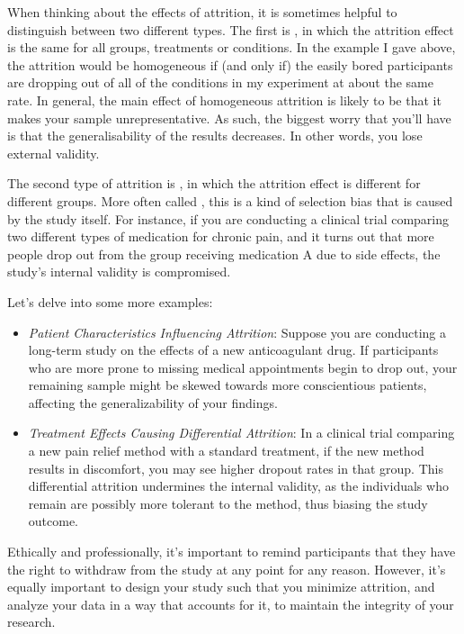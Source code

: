 
When thinking about the effects of attrition, it is sometimes helpful to distinguish between two different types. The first is , in which the attrition effect is the same for all groups, treatments or conditions. In the example I gave above, the attrition would be homogeneous if (and only if) the easily bored participants are dropping out of all of the conditions in my experiment at about the same rate. In general, the main effect of homogeneous attrition is likely to be that it makes your sample unrepresentative. As such, the biggest worry that you'll have is that the generalisability of the results decreases. In other words, you lose external validity.

The second type of attrition is , in which the attrition effect is different for different groups. More often called , this is a kind of selection bias that is caused by the study itself. For instance, if you are conducting a clinical trial comparing two different types of medication for chronic pain, and it turns out that more people drop out from the group receiving medication A due to side effects, the study's internal validity is compromised.

Let's delve into some more examples:

\begin{itemize}
\item \textit{Patient Characteristics Influencing Attrition}: Suppose you are conducting a long-term study on the effects of a new anticoagulant drug. If participants who are more prone to missing medical appointments begin to drop out, your remaining sample might be skewed towards more conscientious patients, affecting the generalizability of your findings.
\item \textit{Treatment Effects Causing Differential Attrition}: In a clinical trial comparing a new pain relief method with a standard treatment, if the new method results in discomfort, you may see higher dropout rates in that group. This differential attrition undermines the internal validity, as the individuals who remain are possibly more tolerant to the method, thus biasing the study outcome.
\end{itemize}

Ethically and professionally, it's important to remind participants that they have the right to withdraw from the study at any point for any reason. However, it's equally important to design your study such that you minimize attrition, and analyze your data in a way that accounts for it, to maintain the integrity of your research.

